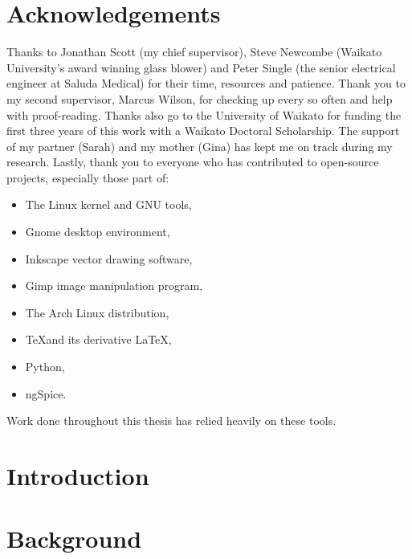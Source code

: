 \chapter*{Acknowledgements}
Thanks to Jonathan Scott (my chief supervisor), Steve Newcombe (Waikato University's award winning glass blower) and Peter Single (the senior electrical engineer at Saluda Medical) for their time, resources and patience.
Thank you to my second supervisor, Marcus Wilson, for checking up every so often and help with proof-reading.
Thanks also go to the University of Waikato for funding the first three years of this work with a Waikato Doctoral Scholarship.
The support of my partner (Sarah) and my mother (Gina) has kept me on track during my research.
Lastly, thank you to everyone who has contributed to open-source projects, especially those part of:
\begin{itemize}
\item The Linux kernel and GNU tools,
\item Gnome desktop environment,
\item Inkscape vector drawing software,
\item Gimp image manipulation program,
\item The Arch Linux distribution,
\item \TeX \space and its derivative \LaTeX,
\item Python,
\item ngSpice.
\end{itemize}
Work done throughout this thesis has relied heavily on these tools.

\tableofcontents{}

\listoffigures

\listoftables

\clearpage


\onehalfspacing




 \chapter{Introduction}
   \label{chap:introduction_main}
   


 \chapter{Background}
   \label{chap:background}
   

